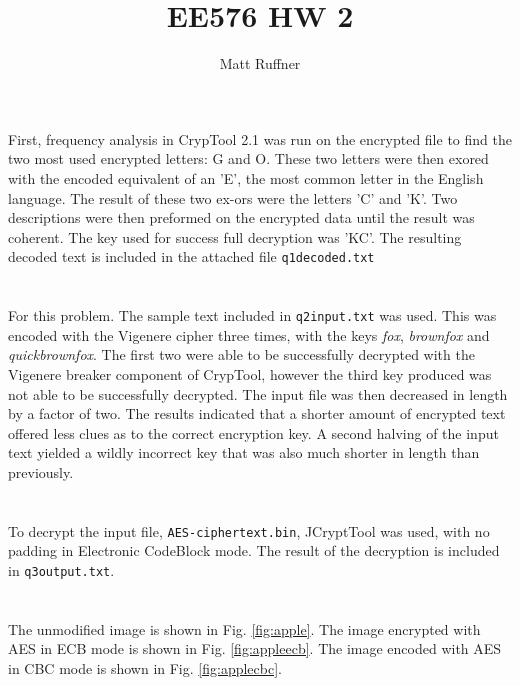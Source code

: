 \documentclass[letterpaper]{article}
\title{EE576 HW 2}
\author{Matt Ruffner}
\begin{document}
\maketitle

\section{}
First, frequency analysis in CrypTool 2.1 was run on the encrypted file to find the two most used encrypted letters: G and O. These two letters were then exored with the encoded equivalent of an 'E', the most common letter in the English language. The result of these two ex-ors were the letters 'C' and 'K'. Two descriptions were then preformed on the encrypted data until the result was coherent. The key used for success full decryption was 'KC'. The resulting decoded text is included in the attached file \texttt{q1decoded.txt}

\section{}
For this problem. The sample text included in \texttt{q2input.txt} was used. This was encoded with the Vigenere cipher three times, with the keys \textit{fox}, \textit{brownfox} and \textit{quickbrownfox}. The first two were able to be successfully decrypted with the Vigenere breaker component of CrypTool, however the third key produced was not able to be successfully decrypted. The input file was then decreased in length by a factor of two. The results indicated that a shorter amount of encrypted text offered less clues as to the correct encryption key. A second halving of the input text yielded  a wildly incorrect key that was also much shorter in length than previously.

\section{}
To decrypt the input file, \texttt{AES-ciphertext.bin}, JCryptTool was used, with no padding in Electronic CodeBlock mode. The result of the decryption is included in \texttt{q3output.txt}.

\section{}


\section{}
The unmodified image is shown in Fig. \ref{fig:apple}. The image encrypted with AES in ECB mode is shown in Fig. \ref{fig:appleecb}. The image encoded with AES in CBC mode is shown in Fig. \ref{fig:applecbc}.
\end{document}
